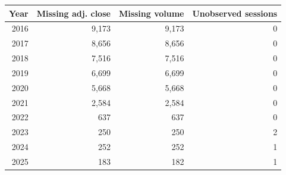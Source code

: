 \begin{tabular}{@{}rrrr@{}}
\toprule
Year & Missing adj. close & Missing volume & Unobserved sessions \\
\midrule
2016 & 9,173 & 9,173 & 0 \\
2017 & 8,656 & 8,656 & 0 \\
2018 & 7,516 & 7,516 & 0 \\
2019 & 6,699 & 6,699 & 0 \\
2020 & 5,668 & 5,668 & 0 \\
2021 & 2,584 & 2,584 & 0 \\
2022 & 637 & 637 & 0 \\
2023 & 250 & 250 & 2 \\
2024 & 252 & 252 & 1 \\
2025 & 183 & 182 & 1 \\
\bottomrule
\end{tabular}
